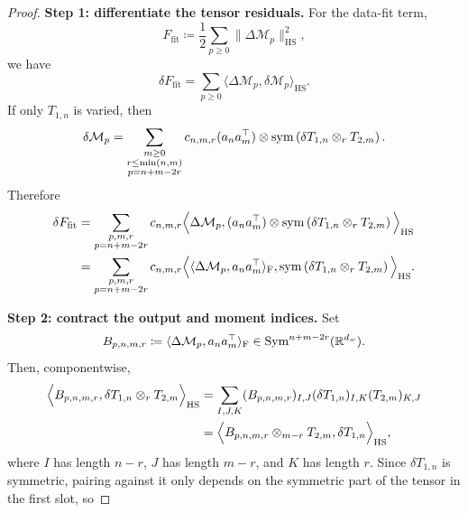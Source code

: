 \begin{proof}
\noindent\textbf{Step 1: differentiate the tensor residuals.}
For the data-fit term,
\begin{equation}
    F_{\mathrm{fit}} \coloneq \frac12\sum_{p\ge 0}\|\Delta\mathcal M_p\|_{\mathrm{HS}}^2,
\end{equation}
we have
\begin{equation}
    \delta F_{\mathrm{fit}}
    = \sum_{p\ge 0}\langle \Delta\mathcal M_p, \delta\mathcal M_p\rangle_{\mathrm{HS}}.
\end{equation}
If only $T_{1,n}$ is varied, then
\begin{equation}
    \delta\mathcal M_p
    =
    \sum_{\substack{m\ge 0\\ r\le \min(n,m)\\ p=n+m-2r}}
    c_{n,m,r}(a_n a_m^\top)\otimes \mathrm{sym}\left({\delta T_{1,n}\otimes_{r} T_{2,m}}\right).
\end{equation}
Therefore
\begin{align}
    \delta F_{\mathrm{fit}}
    &=
    \sum_{\substack{p,m,r\\ p=n+m-2r}}
    c_{n,m,r}
    \Big\langle
        \Delta\mathcal M_p,
        (a_n a_m^\top)\otimes \mathrm{sym}\left({\delta T_{1,n}\otimes_{r} T_{2,m}}\right)
    \Big\rangle_{\mathrm{HS}}
    \\
    &=
    \sum_{\substack{p,m,r\\ p=n+m-2r}}
    c_{n,m,r}
    \Big\langle
        \langle \Delta\mathcal M_p,a_n a_m^\top\rangle_{\mathrm F},
        \mathrm{sym}\left({\delta T_{1,n}\otimes_{r} T_{2,m}}\right)
    \Big\rangle_{\mathrm{HS}}.
\end{align}
\par\noindent\textbf{Step 2: contract the output and moment indices.}
Set
\begin{equation}
    B_{p,n,m,r}
    \coloneq
    \langle \Delta\mathcal M_p,a_n a_m^\top\rangle_{\mathrm F}
    \in \mathrm{Sym}^{n+m-2r}(\mathbb{R}^{d_w}).
\end{equation}
Then, componentwise,
\begin{align}
    \Big\langle B_{p,n,m,r}, \delta T_{1,n}\otimes_{r} T_{2,m}\Big\rangle_{\mathrm{HS}}
    &=
    \sum_{I,J,K}
    (B_{p,n,m,r})_{I,J}
    (\delta T_{1,n})_{I,K}
    (T_{2,m})_{K,J}
    \\
    &=
    \Big\langle B_{p,n,m,r}\otimes_{m-r}T_{2,m},\delta T_{1,n}\Big\rangle_{\mathrm{HS}},
\end{align}
where $I$ has length $n-r$, $J$ has length $m-r$, and $K$ has length $r$. Since $\delta T_{1,n}$ is symmetric, pairing against it only depends on the symmetric part of the tensor in the first slot, so

\end{proof}
